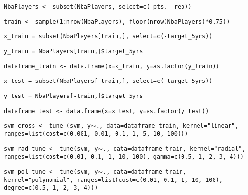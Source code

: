 \begin{center}
\texttt{NbaPlayers <- subset(NbaPlayers, select=c(-pts, -reb))}

\texttt{train <- sample(1:nrow(NbaPlayers), floor(nrow(NbaPlayers)*0.75))}

\texttt{x\_train = subset(NbaPlayers[train,], select=c(-target\_5yrs))}

\texttt{y\_train = NbaPlayers[train,]\$target\_5yrs}

\texttt{dataframe\_train <- data.frame(x=x\_train, y=as.factor(y\_train))}

\texttt{x\_test = subset(NbaPlayers[-train,], select=c(-target\_5yrs))}

\texttt{y\_test = NbaPlayers[-train,]\$target\_5yrs}

\texttt{dataframe\_test <- data.frame(x=x\_test, y=as.factor(y\_test))}

\texttt{svm\_cross <- tune (svm, y$\sim$., data=dataframe\_train, kernel="linear", ranges=list(cost=c(0.001, 0.01, 0.1, 1, 5, 10, 100)))}

\texttt{svm\_rad\_tune <- tune(svm, y$\sim$., data=dataframe\_train, kernel="radial", ranges=list(cost=c(0.01, 0.1, 1, 10, 100), gamma=c(0.5, 1, 2, 3, 4)))}

\texttt{svm\_pol\_tune <- tune(svm, y$\sim$., data=dataframe\_train, kernel="polynomial", ranges=list(cost=c(0.01, 0.1, 1, 10, 100), degree=c(0.5, 1, 2, 3, 4)))}
\end{center}